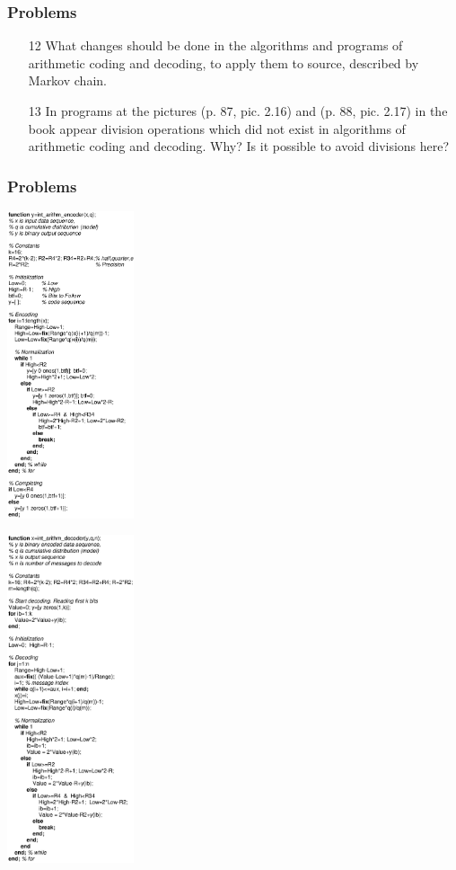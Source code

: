 \documentclass[14pt]{beamer}
\begin{document}
\begin{frame}
\frametitle{Problems}
\begin{enumerate}


 \item[12] What changes should be done in the algorithms and programs of arithmetic coding and decoding, to apply them to source, described by Markov chain.
 

\pause \item[13]  In programs at the pictures (p. 87, pic. 2.16) and (p. 88, pic. 2.17) in the book appear division operations which did not exist in algorithms of arithmetic coding and decoding. Why? Is it possible to avoid divisions here?


\end{enumerate}
\end{frame}


\begin{frame}[fragile]
\frametitle{Problems}


  \begin{multicols}{2}
  \includegraphics[width=0.28\textwidth]{fig_ar_encoder.eps}
  
  \columnbreak
  
  \includegraphics[width=0.28\textwidth]{fig_ar_decoder.eps}
  
  \end{multicols}
\end{frame}
\end{document}
